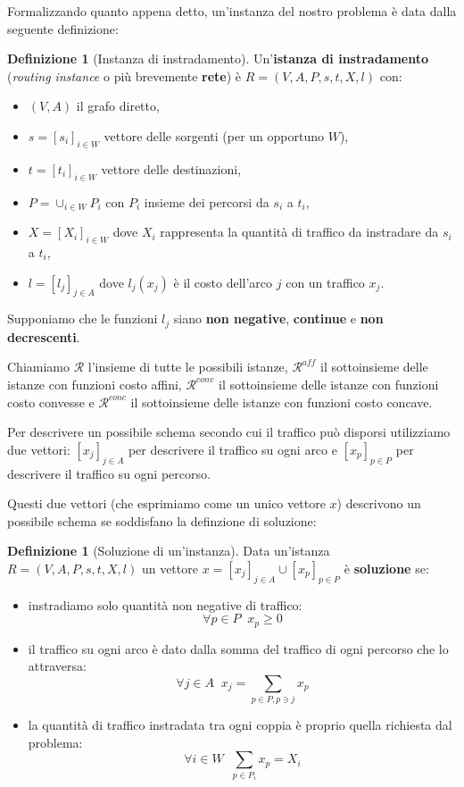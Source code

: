 \documentclass[a4paper]{article}
\newcounter{counter1}
\theoremstyle{plain}
\theoremstyle{definition}
\newtheorem{mydef}[counter1]{Definizione}
\theoremstyle{remark}
\newcommand{\bra}[1]{\left[#1\right]}
\begin{document}
Formalizzando quanto appena detto, un'instanza del nostro problema è
data dalla seguente definizione:

\begin{mydef}[Instanza di instradamento]
  Un'\textbf{istanza di instradamento} (\textit{routing instance} o
  più brevemente \textbf{rete}) è $R=(V,A,P,s,t,X,l)$ con:
  \begin{itemize}
  \item $(V,A)$ il grafo diretto,
  \item $s = \bra{s_i}_{i\in W}$ vettore delle sorgenti (per un opportuno $W$),
  \item $t = \bra{t_i}_{i\in W}$ vettore delle destinazioni,
  \item $P = \cup _{i\in W} P_i$ con $P_i$ insieme dei
    percorsi da $s_i$ a $t_i$,
  \item $X = \bra{X_i}_{i\in W}$ dove $X_i$ rappresenta la quantità di
    traffico da instradare da $s_i$ a $t_i$,
  \item $l = \bra{l_j}_{j\in A}$ dove $l_j(x_j)$ è il costo dell'arco
    $j$ con un traffico $x_j$.
  \end{itemize}
  Supponiamo che le funzioni $l_j$ siano \textbf{non negative},
  \textbf{continue} e \textbf{non decrescenti}.
\end{mydef}

Chiamiamo $\mathcal{R}$ l'insieme di tutte le possibili istanze,
$\mathcal{R}^{aff}$ il sottoinsieme delle istanze con funzioni costo
affini, $\mathcal{R}^{conv}$ il sottoinsieme delle istanze con funzioni costo
convesse e $\mathcal{R}^{conc}$ il sottoinsieme delle istanze con
funzioni costo concave.

Per descrivere un possibile schema secondo cui il traffico può
disporsi utilizziamo due vettori: $\bra{x_j}_{j\in A}$ per descrivere
il traffico su ogni arco e $\bra{x_p}_{p\in P}$ per descrivere il
traffico su ogni percorso.

Questi due vettori (che esprimiamo come un unico vettore $x$)
descrivono un possibile schema se soddisfano la definzione di soluzione:

\begin{mydef}[Soluzione di un'instanza]
  Data un'istanza $R=(V,A,P,s,t,X,l)$ un vettore
  $x = \bra{x_j}_{j\in A} \cup \bra{x_p}_{p\in P}$ è \textbf{soluzione} se:
  \begin{itemize}
  \item instradiamo solo quantità non negative di traffico: \[ \forall p\in P\;\; x_p \ge 0\]
  \item il traffico su ogni arco è dato dalla somma del traffico di
    ogni percorso che lo attraversa: \[ \forall j\in A\;\; x_j = \sum_{p\in P,p\ni j} x_p\]
  \item la quantità di traffico instradata tra ogni coppia è proprio
    quella richiesta dal problema: \[\forall i\in W\;\; \sum_{p\in P_i} x_p = X_i\]
  \end{itemize}
\end{mydef}
\end{document}
